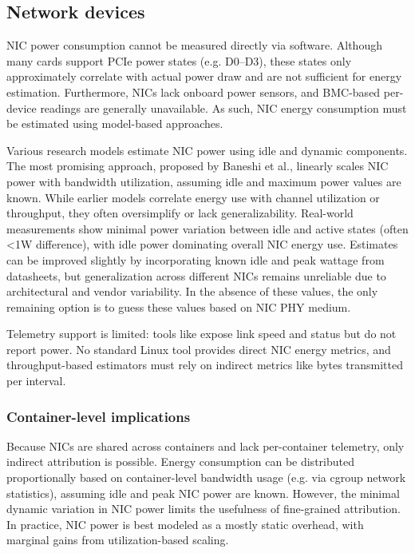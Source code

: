 \subsection{Network devices}

NIC power consumption cannot be measured directly via software. Although many cards support PCIe power states (e.g. D0–D3), these states only approximately correlate with actual power draw and are not sufficient for energy estimation. Furthermore, NICs lack onboard power sensors, and BMC-based per-device readings are generally unavailable. As such, NIC energy consumption must be estimated using model-based approaches.

Various research models estimate NIC power using idle and dynamic components. The most promising approach, proposed by Baneshi et al., linearly scales NIC power with bandwidth utilization, assuming idle and maximum power values are known. While earlier models correlate energy use with channel utilization or throughput, they often oversimplify or lack generalizability. Real-world measurements show minimal power variation between idle and active states (often <1W difference), with idle power dominating overall NIC energy use. Estimates can be improved slightly by incorporating known idle and peak wattage from datasheets, but generalization across different NICs remains unreliable due to architectural and vendor variability. In the absence of these values, the only remaining option is to guess these values based on NIC PHY medium.

Telemetry support is limited: tools like  expose link speed and status but do not report power. No standard Linux tool provides direct NIC energy metrics, and throughput-based estimators must rely on indirect metrics like bytes transmitted per interval.

\subsubsection{Container-level implications}
Because NICs are shared across containers and lack per-container telemetry, only indirect attribution is possible. Energy consumption can be distributed proportionally based on container-level bandwidth usage (e.g. via cgroup network statistics), assuming idle and peak NIC power are known. However, the minimal dynamic variation in NIC power limits the usefulness of fine-grained attribution. In practice, NIC power is best modeled as a mostly static overhead, with marginal gains from utilization-based scaling.

